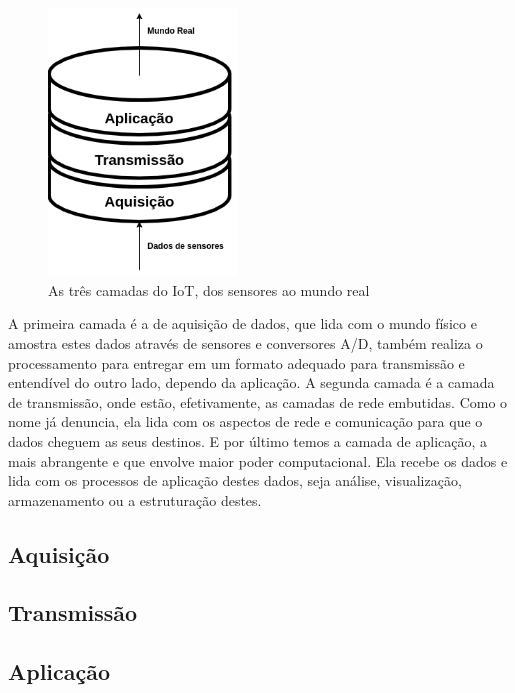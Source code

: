 \begin{figure}[h!]
\label{fig:1.1.0/camadas_iot}
\centering
\includegraphics[width=5cm]{./02_Capitulos/02_Cap1/figures/iot_stack}
\caption{As três camadas do IoT, dos sensores ao mundo real}
\end{figure}

A primeira camada é a de aquisição de dados, que lida com o mundo físico e amostra estes dados através de sensores e conversores A/D, também realiza o processamento para entregar em um formato adequado para transmissão e entendível do outro lado, dependo da aplicação. A segunda camada é a camada de transmissão, onde estão, efetivamente, as camadas de rede embutidas. Como o nome já denuncia, ela lida com os aspectos de rede e comunicação para que o dados cheguem as seus destinos. E por último temos a camada de aplicação, a mais abrangente e que envolve maior poder computacional. Ela recebe os dados e lida com os processos de aplicação destes dados, seja análise, visualização, armazenamento ou a estruturação destes.

\subsection{Aquisição}
\label{subsection:aquisicao}

\subsection{Transmissão}
\label{subsection:transmicao}

\subsection{Aplicação}
\label{subsection:aplicacao}



